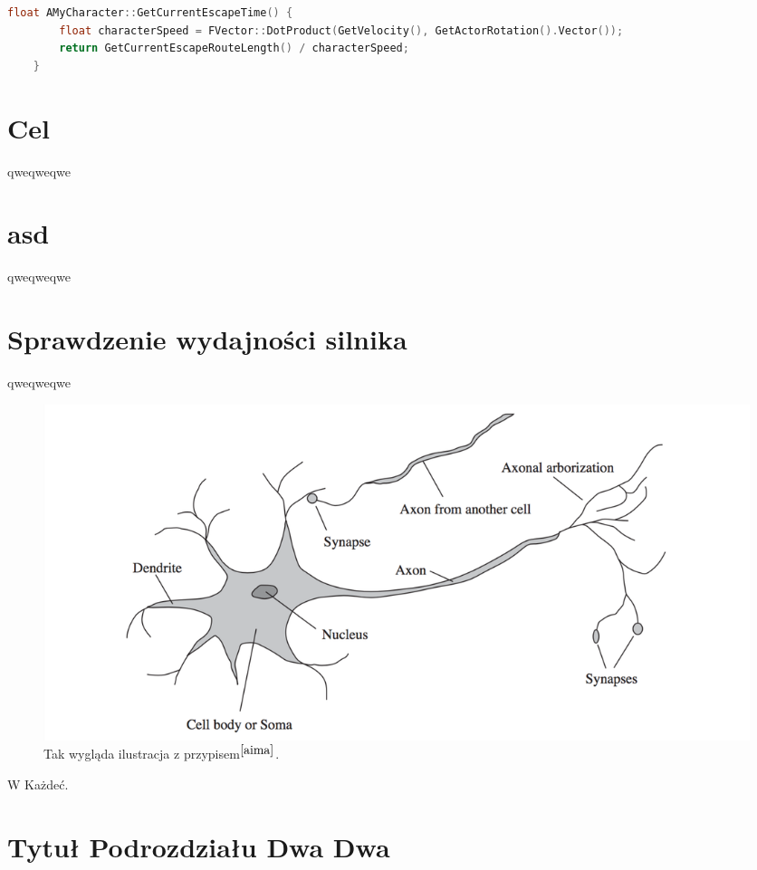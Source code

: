 \documentclass[12pt]{report}
\begin{document}
\begin{lstlisting}[language=C++, backgroundcolor=\color{black!5}, basicstyle=\footnotesize, caption=Funkcja GetCurrentEscapeTime w klasie AMyCharacter.cpp.]
	float AMyCharacter::GetCurrentEscapeTime() {
		float characterSpeed = FVector::DotProduct(GetVelocity(), GetActorRotation().Vector());
		return GetCurrentEscapeRouteLength() / characterSpeed;
	}
\end{lstlisting}
\section{Cel}
qweqweqwe
\section{asd}
qweqweqwe
\section{Sprawdzenie wydajności silnika}
qweqweqwe




















\begin{figure}[h!]
\includegraphics[width=\textwidth]{neuron}
\caption{Tak wygląda ilustracja z przypisem$^{\cite{aima}}$.}
\end{figure}

W Każdeć. 

\section{Tytuł Podrozdziału Dwa Dwa}
\end{document}
